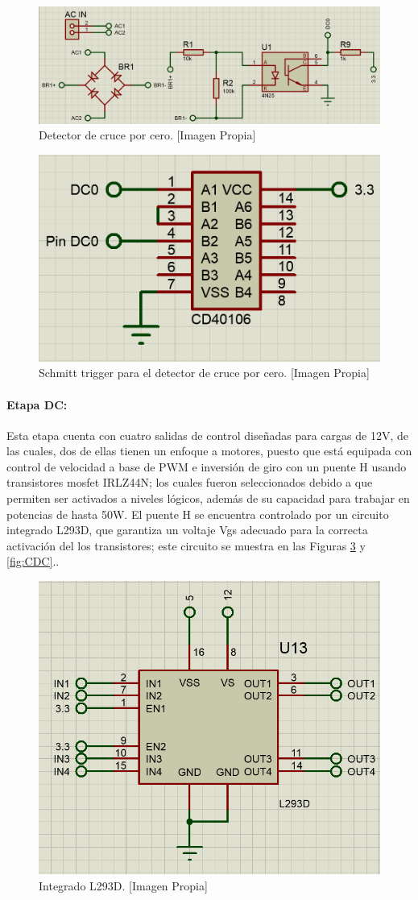 		\begin{figure}[H]
			\centering
			\caption[Detector de cruce por cero.]{Detector de cruce por cero.  [Imagen Propia]}
			\label{fig:DC01}
			\includegraphics[width=0.85\linewidth]{Imagenes/DC01}
		\end{figure}
	
		\begin{figure}[H]
			\centering
			\caption[Schmitt trigger para el detector de cruce por cero.]{Schmitt trigger para el detector de cruce por cero. [Imagen Propia]}
			\label{fig:DC02}
			\includegraphics[width=0.5\linewidth]{Imagenes/DC02}
		\end{figure}
	
	\paragraph{Etapa DC:}
		Esta etapa cuenta con cuatro salidas de control diseñadas para cargas de 12V, de las cuales, dos de ellas tienen un enfoque a motores, puesto que está equipada con control de velocidad a base de PWM e inversión de giro con un puente H usando transistores mosfet IRLZ44N; los cuales fueron seleccionados debido a que permiten ser activados a niveles lógicos, además de su capacidad para trabajar en potencias de hasta 50W. El puente H se encuentra controlado por un circuito integrado L293D, que garantiza un voltaje Vgs adecuado para la correcta activación del los transistores; este circuito se muestra en las Figuras \ref{fig:L293D} y \ref{fig:CDC}.\cite{IRL}.\\

		\begin{figure}[H]
			\centering
			\caption[Integrado L293D.]{Integrado L293D. [Imagen Propia]}
			\label{fig:L293D}
			\includegraphics[width=0.5\linewidth]{Imagenes/L293D}
		\end{figure}

